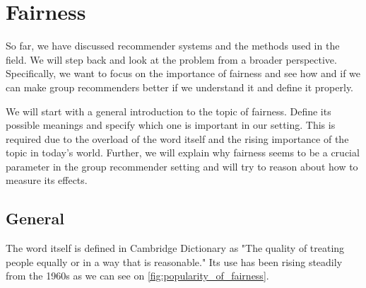 \chapter{Fairness} \label{chap:fairness}

So far, we have discussed recommender systems and the methods used in the field. We will step back and look at the problem from a broader perspective. Specifically, we want to focus on the importance of fairness and see how and if we can make group recommenders better if we understand it and define it properly.

We will start with a general introduction to the topic of fairness. Define its possible meanings and specify which one is important in our setting. This is required due to the overload of the word itself and the rising importance of the topic in today's world. Further, we will explain why fairness seems to be a crucial parameter in the group recommender setting and will try to reason about how to measure its effects.





\section{General} \label{sec:02_general}





The word itself is defined in Cambridge Dictionary \cite{fairness_definition} as "The quality of treating people equally or in a way that is reasonable." Its use has been rising steadily from the 1960s as we can see on \ref{fig:popularity_of_fairness}.

